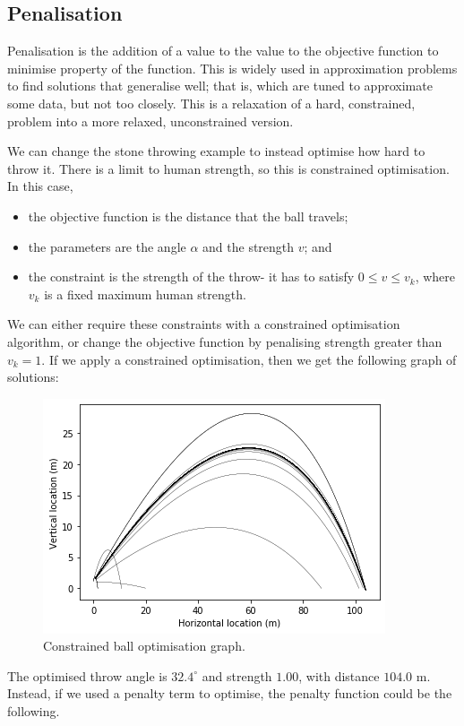 \documentclass[a4paper, openany]{memoir}
\begin{document}
\subsection{Penalisation}
Penalisation is the addition of a value to the value to the objective function to minimise property of the function. This is widely used in approximation problems to find solutions that generalise well; that is, which are tuned to approximate some data, but not too closely. This is a relaxation of a hard, constrained, problem into a more relaxed, unconstrained version.

We can change the stone throwing example to instead optimise how hard to throw it. There is a limit to human strength, so this is constrained optimisation. In this case,
\begin{itemize}
    \item the objective function is the distance that the ball travels;
    \item the parameters are the angle $\alpha$ and the strength $v$; and
    \item the constraint is the strength of the throw- it has to satisfy $0 \leq v \leq v_k$, where $v_k$ is a fixed maximum human strength.
\end{itemize}
We can either require these constraints with a constrained optimisation algorithm, or change the objective function by penalising strength greater than $v_k = 1$. If we apply a constrained optimisation, then we get the following graph of solutions:
\begin{figure}[H]
    \centering
    \includegraphics[scale=0.6]{src/4.4 constrained ball optimisation.png}
    \caption{Constrained ball optimisation graph.}
\end{figure}
\noindent The optimised throw angle is $32.4^{\circ}$ and strength $1.00$, with distance $104.0$ m. Instead, if we used a penalty term to optimise, the penalty function could be the following.
\end{document}
